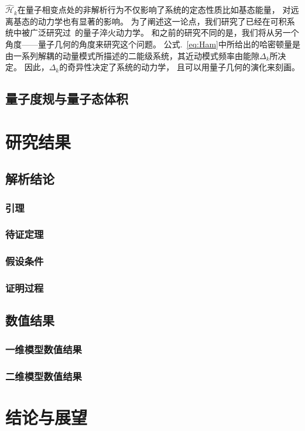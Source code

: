 			$\hat{\mathcal{H}}_k$在量子相变点处的非解析行为不仅影响了系统的定态性质比如基态能量， 对远离基态的动力学也有显著的影响。
			为了阐述这一论点，我们研究了已经在可积系统中被广泛研究过~\cite{Barthel2008,Calabrese2011,Mitra2018}的量子淬火动力学。
			和之前的研究不同的是，我们将从另一个角度——量子几何的角度来研究这个问题。
			公式.~\eqref{eq:Ham}中所给出的哈密顿量是由一系列解耦的动量模式所描述的二能级系统，其近动模式频率由能隙$\Delta_k$所决定。
			因此，$\Delta_k$的奇异性决定了系统的动力学， 且可以用量子几何的演化来刻画。
		
		\subsection{量子度规与量子态体积}
		

	\section{研究结果}
	
		\subsection{解析结论}

			\subsubsection{引理}
			
			\subsubsection{待证定理}

			\subsubsection{假设条件}

			\subsubsection{证明过程}
			
		\subsection{数值结果}
		
			\subsubsection{一维模型数值结果}
			
			\subsubsection{二维模型数值结果}	

	\section{结论与展望}